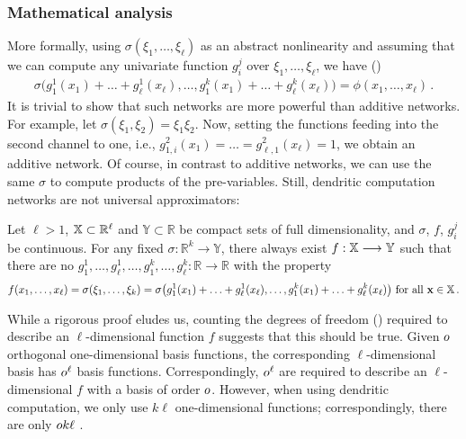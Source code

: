 \subsubsection{Mathematical analysis}
More formally, using $\sigma(\xi_1, \ldots, \xi_\ell)$ as an abstract nonlinearity and assuming that we can compute any univariate function $g_i^j$ over $\xi_1, \ldots, \xi_\ell$, we have ()
\begin{align}
	\sigma \bigl(
		g_{1}^1(x_1) + \ldots + g_{\ell}^1(x_\ell), \ldots, g_{1}^k(x_1) + \ldots + g_{\ell}^k(x_\ell)
	\bigr) = \phi(x_1, \ldots, x_\ell) \,.
	\label{eqn:dendritic_computation_theory}
\end{align}
It is trivial to show that such networks are more powerful than additive networks.
For example, let $\sigma(\xi_1, \xi_2) = \xi_1 \xi_2$.
Now, setting the functions feeding into the second channel to one, i.e., $g_{1, i}^2(x_1) = \ldots = g_{\ell, 1}^2(x_\ell) = 1$, we obtain an additive network.
Of course, in contrast to additive networks, we can use the same $\sigma$ to compute products of the pre-variables.
Still, dendritic computation networks are not universal approximators:
\begin{conjecture}
\label{thm:dendritic_compuation_incomplete}
Let $\ell > 1$, $\mathbb{X} \subset \mathbb{R}^\ell$ and $\mathbb{Y} \subset \mathbb{R}$ be compact sets of full dimensionality, and $\sigma$, $f$, $g^j_i$ be continuous.
For any fixed $\sigma : \mathbb{R}^k \longrightarrow \mathbb{Y}$, there always exist $f : \mathbb{X} \longrightarrow \mathbb{Y}$ such that there are no $g^1_1, \ldots, g^1_\ell, \ldots, g^k_1, \ldots, g^k_\ell : \mathbb{R}  \longrightarrow \mathbb{R}$ with the property
\begin{align*}
	f(x_1, \ldots, x_\ell) = \sigma(\xi_1, \ldots, \xi_k) = \sigma\bigl( g^1_1(x_1) + \ldots + g^1_\ell(x_\ell), \ldots,  g^k_1(x_1) + \ldots + g^k_\ell(x_\ell)\bigr) \text{ for all } \mathbf{x} \in \mathbb{X} \,.
\end{align*}
\end{conjecture}
\noindent While a rigorous proof eludes us, counting the degrees of freedom (\DOF) required to describe an $\ell$-dimensional function $f$ suggests that this should be true.
Given $o$ orthogonal one-dimensional basis functions, the corresponding $\ell$-dimensional basis has $o^\ell$ basis functions.
Correspondingly, $o^\ell$ \DOF are required to describe an $\ell$-dimensional $f$ with a basis of order $o$.
However, when using dendritic computation, we only use $k \ell$ one-dimensional functions; correspondingly, there are only $o k \ell$ \DOF.
